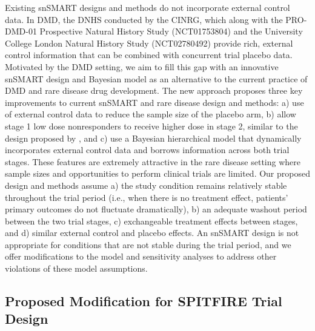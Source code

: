 Existing \ac{snSMART} designs and methods do not incorporate external control data. In DMD, the \ac{DNHS} conducted by the \ac{CINRG}, which along with the PRO-DMD-01 Prospective Natural History Study (NCT01753804) and the University College London Natural History Study (NCT02780492) provide rich, external control information that can be combined with concurrent trial placebo data. Motivated by the \ac{DMD} setting, we aim to fill this gap with an innovative \ac{snSMART} design and Bayesian model as an alternative to the current practice of \ac{DMD} and rare disease drug development. The new approach proposes three key improvements to current \ac{snSMART} and rare disease design and methods: a) use of external control data to reduce the sample size of the placebo arm, b) allow stage 1 low dose nonresponders to receive higher dose in stage 2, similar to the design proposed by \cite{fang2021bayesian, fang2023comparing}, and c) use a Bayesian hierarchical model that dynamically incorporates external control data and borrows information across both trial stages. These features are extremely attractive in the rare disease setting where sample sizes and opportunities to perform clinical trials are limited. Our proposed design and methods assume a) the study condition remains relatively stable throughout the trial period (i.e., when there is no treatment effect, patients' primary outcomes do not fluctuate dramatically), b) an adequate washout period between the two trial stages, c) exchangeable treatment effects between stages, and d) similar external control and placebo effects. An \ac{snSMART} design is not appropriate for conditions that are not stable during the trial period, and we offer modifications to the model and sensitivity analyses to address other violations of these model assumptions.


\subsection{Proposed Modification for SPITFIRE Trial Design}

